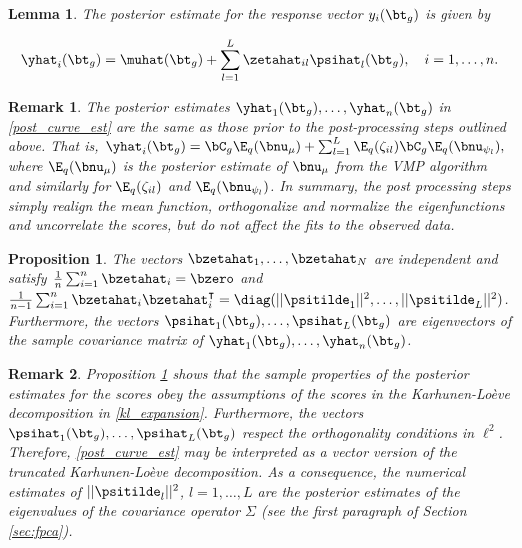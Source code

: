 \documentclass[ba]{imsart}
\numberwithin{equation}{section}
\theoremstyle{plain}
\newtheorem{prop}{Proposition}[section]
\newtheorem{lem}{Lemma}[section]
\newtheorem*{remark}{Remark}
\def\numu{\bnu_\mu}
\newcommand\nupsi[1]{\bnu_{\psi_{#1}}}
\begin{document}
\begin{lem}
	
	The posterior estimate for the response vector $y_i (\bt_g)$ is given by
	
	\begin{equation}
		\yhat_i (\bt_g) = \muhat (\bt_g) + \sum_{l=1}^L \zetahat_{il} \psihat_l (\bt_g), \quad i = 1, \dots, n.
	\label{post_curve_est}
	\end{equation}
	
\label{lem:response_est}
\end{lem}

\begin{remark}
	
	The posterior estimates $\yhat_1 (\bt_g), \dots, \yhat_n (\bt_g)$ in \eqref{post_curve_est} are
	the same as those prior to the post-processing steps outlined above. That is,
	$\yhat_i (\bt_g) = \bC_g \E_q (\numu) + \sum_{l=1}^L \E_q (\zeta_{il}) \bC_g \E_q (\nupsi{l}),$
	where $\E_q (\numu)$ is the posterior estimate of $\numu$ from the VMP algorithm and similarly for
	$\E_q (\zeta_{il})$ and $\E_q (\nupsi{l})$. In summary, the post processing steps simply realign the mean function,
	orthogonalize and normalize the eigenfunctions and uncorrelate the scores, but do not affect the fits to the
	observed data.
	
\end{remark}

\begin{prop}
	
	The vectors $\bzetahat_1, \dots, \bzetahat_N$ are independent and satisfy $\frac{1}{n} \sum_{i=1}^n \bzetahat_i =
	\bzero$ and $\frac{1}{n-1} \sum_{i=1}^n \bzetahat_i \bzetahat^{\intercal}_i = \diag (
	|| \psitilde_1 ||^2, \dots, || \psitilde_L ||^2)$.
	Furthermore, the vectors $\psihat_1 (\bt_g), \dots, \psihat_L (\bt_g)$ are eigenvectors of the sample
	covariance matrix of $\yhat_1 (\bt_g), \dots, \yhat_n (\bt_g)$.
	
\label{prop:bi_orthogonal}
\end{prop}

\begin{remark}
	
	Proposition \ref{prop:bi_orthogonal} shows that the sample properties of the posterior estimates for the scores
	obey the assumptions of the scores in the Karhunen-Lo\`{e}ve decomposition in \eqref{kl_expansion}.
	Furthermore, the vectors $\psihat_1 (\bt_g), \dots, \psihat_L (\bt_g)$ respect the orthogonality conditions in $\ell^2$.
	Therefore, \eqref{post_curve_est} may be interpreted as a vector version of the truncated
	Karhunen-Lo\`{e}ve decomposition. As a consequence, the numerical estimates of
	$|| \psitilde_l ||^2$, $l = 1, \dots, L$ are the posterior estimates of the eigenvalues of the covariance operator
	$\Sigma$ (see the first paragraph of Section \ref{sec:fpca}).
	
\end{remark}
\end{document}
